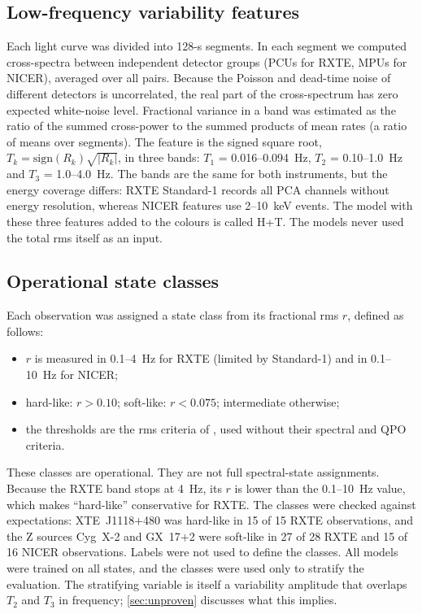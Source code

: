 \documentclass[11pt,a4paper]{article}
\newcommand{\HT}{\textsf{H+T}}
\begin{document}
\subsection{Low-frequency variability features}\label{sec:timing_features}
Each light curve was divided into 128-s segments. In each segment we computed cross-spectra between independent detector
groups (PCUs for RXTE, MPUs for NICER), averaged over all pairs. Because the Poisson and dead-time noise of different
detectors is uncorrelated, the real part of the cross-spectrum has zero expected white-noise level. Fractional variance
in a band was estimated as the ratio of the summed cross-power to the summed products of mean rates (a ratio of means
over segments). The feature is the signed square root, $T_k=\mathrm{sign}(R_k)\sqrt{|R_k|}$, in three bands:
$T_1$ = 0.016--0.094~Hz, $T_2$ = 0.10--1.0~Hz and $T_3$ = 1.0--4.0~Hz. The bands are the same for both instruments, but
the energy coverage differs: RXTE Standard-1 records all PCA channels without energy resolution, whereas NICER features
use 2--10~keV events. The model with these three features added to the colours is called \HT{}. The models never used
the total rms itself as an input.

\subsection{Operational state classes}\label{sec:states}
Each observation was assigned a state class from its fractional rms $r$, defined as follows:
\begin{itemize}\setlength\itemsep{1pt}
\item $r$ is measured in 0.1--4~Hz for RXTE (limited by Standard-1) and in 0.1--10~Hz for NICER;
\item hard-like: $r>0.10$; soft-like: $r<0.075$; intermediate otherwise;
\item the thresholds are the rms criteria of \citet{RemillardMcClintock2006}, used without their spectral and QPO
criteria.
\end{itemize}
These classes are operational. They are not full spectral-state assignments. Because the RXTE band stops at 4~Hz, its
$r$ is lower than the 0.1--10~Hz value, which makes ``hard-like'' conservative for RXTE. The classes were checked against
expectations: XTE~J1118$+$480 was hard-like in 15 of 15 RXTE observations, and the Z sources Cyg~X-2 and GX~17$+$2 were
soft-like in 27 of 28 RXTE and 15 of 16 NICER observations. Labels were not used to define the classes. All models were
trained on all states, and the classes were used only to stratify the evaluation. The stratifying variable is itself a
variability amplitude that overlaps $T_2$ and $T_3$ in frequency; \cref{sec:unproven} discusses what this implies.
\end{document}
